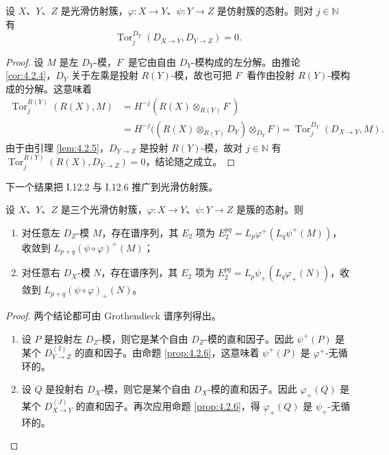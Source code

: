 \begin{proposition}\label{prop:4.2.6}
设 $X$、$Y$、$Z$ 是光滑仿射簇，$\varphi:X\to Y$、$\psi:Y\to Z$ 是仿射簇的态射。则对 $j\in\mathbb{N}$ 有
$$\operatorname{Tor}^{D_Y}_j(D_{X\to Y},D_{Y\to Z})=0.$$
\end{proposition}

\begin{proof}
设 $M$ 是左 $D_Y$-模，$F^\cdot$ 是它由自由 $D_Y$-模构成的左分解。由推论 \ref{cor:4.2.4}，$D_Y$ 关于左乘是投射 $R(Y)$-模，故也可把 $F^\cdot$ 看作由投射 $R(Y)$-模构成的分解。这意味着
\begin{align*}
\operatorname{Tor}^{R(Y)}_j(R(X),M)&=H^{-j}(R(X)\otimes_{R(Y)}F^\cdot)\\
&=H^{-j}\bigl((R(X)\otimes_{R(Y)}D_Y)\otimes_{D_Y}F^\cdot\bigr)
=\operatorname{Tor}^{D_Y}_j(D_{X\to Y},M).
\end{align*}
由于由引理 \ref{lem:4.2.5}，$D_{Y\to Z}$ 是投射 $R(Y)$-模，故对 $j\in\mathbb{N}$ 有
$\operatorname{Tor}^{R(Y)}_j(R(X),D_{Y\to Z})=0$，结论随之成立。
\end{proof}

下一个结果把 I.12.2 与 I.12.6 推广到光滑仿射簇。

\begin{theorem}\label{thm:4.2.7}
设 $X$、$Y$、$Z$ 是三个光滑仿射簇，$\varphi:X\to Y$、$\psi:Y\to Z$ 是簇的态射。则
\begin{enumerate}[label=(\roman*)]
  \item 对任意左 $D_Z$-模 $M$，存在谱序列，其 $E_2$ 项为
    $E_2^{pq}=L_p\varphi^+(L_q\psi^+(M))$，收敛到 $L_{p+q}(\psi\circ\varphi)^+(M)$；
  \item 对任意右 $D_X$-模 $N$，存在谱序列，其 $E_2$ 项为
    $E_2^{pq}=L_p\psi_+(L_q\varphi_+(N))$，收敛到 $L_{p+q}(\psi\circ\varphi)_+(N)$。
\end{enumerate}
\end{theorem}

\begin{proof}
两个结论都可由 Grothendieck 谱序列得出。
\begin{enumerate}[label=(\roman*)]
  \item 设 $P$ 是投射左 $D_Z$-模，则它是某个自由 $D_Z$-模的直和因子。因此 $\psi^+(P)$ 是某个
    $D_{Y\to Z}^{(I)}$ 的直和因子。由命题 \ref{prop:4.2.6}，这意味着 $\psi^+(P)$ 是 $\varphi^+$-无循环的。
  \item 设 $Q$ 是投射右 $D_X$-模，则它是某个自由 $D_X$-模的直和因子。因此 $\varphi_+(Q)$ 是某个
    $D_{X\to Y}^{(J)}$ 的直和因子。再次应用命题 \ref{prop:4.2.6}，得 $\varphi_+(Q)$ 是 $\psi_+$-无循环的。
\end{enumerate}
\end{proof}

